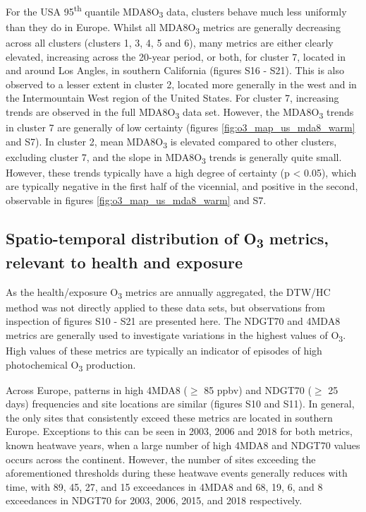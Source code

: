 \documentclass[journal abbreviation, manuscript]{copernicus}
\begin{document}
For the USA 95\textsuperscript{th} quantile MDA8O\textsubscript{3} data, clusters behave much less uniformly than they do in Europe. Whilst all MDA8O\textsubscript{3} metrics are generally decreasing across all clusters (clusters 1, 3, 4, 5 and 6), many metrics are either clearly elevated, increasing across the 20-year period, or both, for cluster 7, located in and around Los Angles, in southern California (figures S16 - S21). This is also observed to a lesser extent in cluster 2, located more generally in the west and in the Intermountain West region of the United States. For cluster 7, increasing trends are observed in the full MDA8O\textsubscript{3} data set. However, the MDA8O\textsubscript{3} trends in cluster 7 are generally of low certainty (figures \ref{fig:o3_map_us_mda8_warm} and S7). In cluster 2, mean MDA8O\textsubscript{3} is elevated compared to other clusters, excluding cluster 7, and the slope in MDA8O\textsubscript{3} trends is generally quite small. However, these trends typically have a high degree of certainty (p < 0.05), which are typically negative in the first half of the vicennial, and positive in the second, observable in figures \ref{fig:o3_map_us_mda8_warm} and S7. 

\subsection{Spatio-temporal distribution of O\textsubscript{3} metrics, relevant to health and exposure} \label{sect:metrics_distribution}

As the health/exposure O\textsubscript{3} metrics are annually aggregated, the DTW/HC method was not directly applied to these data sets, but observations from inspection of figures S10 - S21 are presented here. The NDGT70 and 4MDA8 metrics are generally used to investigate variations in the highest values of O\textsubscript{3}. High values of these metrics are typically an indicator of episodes of high photochemical O\textsubscript{3} production.

Across Europe, patterns in high 4MDA8 ($\ge$ 85 ppbv) and NDGT70 ($\ge$ 25 days) frequencies and site locations are similar (figures S10 and S11). In general, the only sites that consistently exceed these metrics are located in southern Europe. Exceptions to this can be seen in 2003, 2006 and 2018 for both metrics, known heatwave years, when a large number of high 4MDA8 and NDGT70 values occurs across the continent. However, the number of sites exceeding the aforementioned thresholds during these heatwave events generally reduces with time, with 89, 45, 27, and 15 exceedances in 4MDA8 and 68, 19, 6, and 8 exceedances in NDGT70 for 2003, 2006, 2015, and 2018 respectively.
\end{document}
